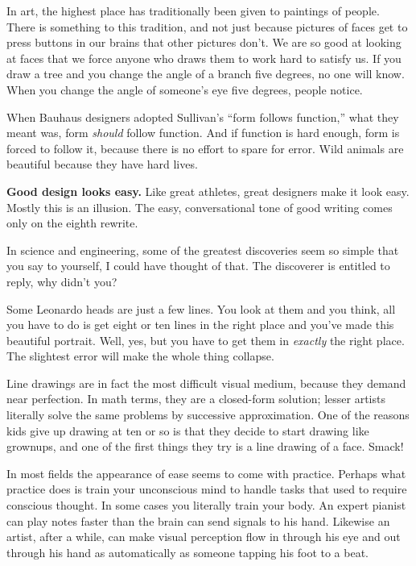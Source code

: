 In art, the highest place has traditionally been given to paintings of
people. There is something to this tradition, and not just because
pictures of faces get to press buttons in our brains that other pictures
don't. We are so good at looking at faces that we force anyone who draws
them to work hard to satisfy us. If you draw a tree and you change the
angle of a branch five degrees, no one will know. When you change the
angle of someone's eye five degrees, people notice.

When Bauhaus designers adopted Sullivan's ``form follows function,''
what they meant was, form \emph{should} follow function. And if function
is hard enough, form is forced to follow it, because there is no effort
to spare for error. Wild animals are beautiful because they have hard
lives.

\textbf{Good design looks easy.} Like great athletes, great designers
make it look easy. Mostly this is an illusion. The easy, conversational
tone of good writing comes only on the eighth rewrite.

In science and engineering, some of the greatest discoveries seem so
simple that you say to yourself, I could have thought of that. The
discoverer is entitled to reply, why didn't you?

Some Leonardo heads are just a few lines. You look at them and you
think, all you have to do is get eight or ten lines in the right place
and you've made this beautiful portrait. Well, yes, but you have to get
them in \emph{exactly} the right place. The slightest error will make
the whole thing collapse.

Line drawings are in fact the most difficult visual medium, because they
demand near perfection. In math terms, they are a closed-form solution;
lesser artists literally solve the same problems by successive
approximation. One of the reasons kids give up drawing at ten or so is
that they decide to start drawing like grownups, and one of the first
things they try is a line drawing of a face. Smack!

In most fields the appearance of ease seems to come with practice.
Perhaps what practice does is train your unconscious mind to handle
tasks that used to require conscious thought. In some cases you
literally train your body. An expert pianist can play notes faster than
the brain can send signals to his hand. Likewise an artist, after a
while, can make visual perception flow in through his eye and out
through his hand as automatically as someone tapping his foot to a beat.

